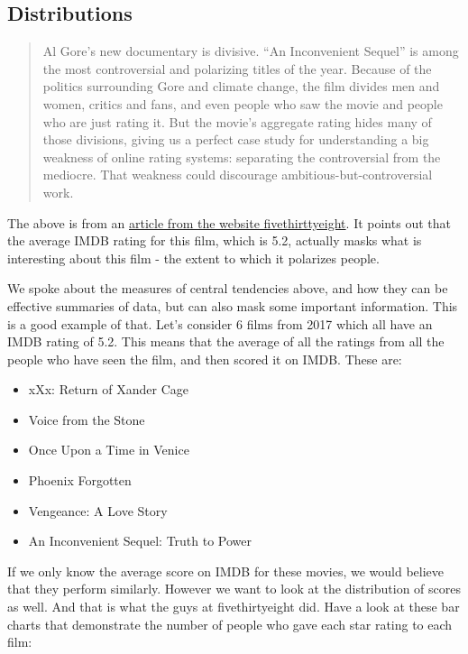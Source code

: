 \documentclass[
]{book}
\providecommand{\tightlist}{%
  \setlength{\itemsep}{0pt}\setlength{\parskip}{0pt}}
\begin{document}
\hypertarget{distributions}{%
\subsection{Distributions}\label{distributions}}

\begin{quote}
Al Gore's new documentary is divisive. ``An Inconvenient Sequel'' is among the most controversial and polarizing titles of the year. Because of the politics surrounding Gore and climate change, the film divides men and women, critics and fans, and even people who saw the movie and people who are just rating it. But the movie's aggregate rating hides many of those divisions, giving us a perfect case study for understanding a big weakness of online rating systems: separating the controversial from the mediocre. That weakness could discourage ambitious-but-controversial work.
\end{quote}

The above is from an \href{https://fivethirtyeight.com/features/al-gores-new-movie-exposes-the-big-flaw-in-online-movie-ratings/}{article from the website fivethirttyeight}. It points out that the average IMDB rating for this film, which is 5.2, actually masks what is interesting about this film - the extent to which it polarizes people.

We spoke about the measures of central tendencies above, and how they can be effective summaries of data, but can also mask some important information. This is a good example of that. Let's consider 6 films from 2017 which all have an IMDB rating of 5.2. This means that the average of all the ratings from all the people who have seen the film, and then scored it on IMDB. These are:

\begin{itemize}
\tightlist
\item
  xXx: Return of Xander Cage
\item
  Voice from the Stone
\item
  Once Upon a Time in Venice
\item
  Phoenix Forgotten
\item
  Vengeance: A Love Story
\item
  An Inconvenient Sequel: Truth to Power
\end{itemize}

If we only know the average score on IMDB for these movies, we would believe that they perform similarly. However we want to look at the distribution of scores as well. And that is what the guys at fivethirtyeight did. Have a look at these bar charts that demonstrate the number of people who gave each star rating to each film:
\end{document}
